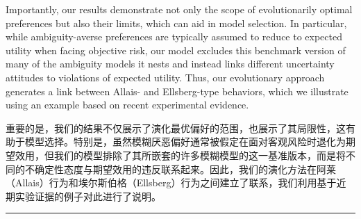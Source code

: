 \documentclass[12pt,a4paper]{article}
\newenvironment{original}
  {\par\noindent\color{black}\smallskip}
  {\par\smallskip}
\newenvironment{translation}
  {\par\noindent\color{blue!70!black}\smallskip}
  {\par\medskip\hrule\medskip}
\begin{document}
\begin{original}
Importantly, our results demonstrate not only the scope of evolutionarily optimal preferences but also their limits, which can aid in model selection. In particular, while ambiguity-averse preferences are typically assumed to reduce to expected utility when facing objective risk, our model excludes this benchmark version of many of the ambiguity models it nests and instead links different uncertainty attitudes to violations of expected utility. Thus, our evolutionary approach generates a link between Allais- and Ellsberg-type behaviors, which we illustrate using an example based on recent experimental evidence.
\end{original}
\begin{translation}
重要的是，我们的结果不仅展示了演化最优偏好的范围，也展示了其局限性，这有助于模型选择。特别是，虽然模糊厌恶偏好通常被假定在面对客观风险时退化为期望效用，但我们的模型排除了其所嵌套的许多模糊模型的这一基准版本，而是将不同的不确定性态度与期望效用的违反联系起来。因此，我们的演化方法在阿莱（Allais）行为和埃尔斯伯格（Ellsberg）行为之间建立了联系，我们利用基于近期实验证据的例子对此进行了说明。
\end{translation}
\end{document}
